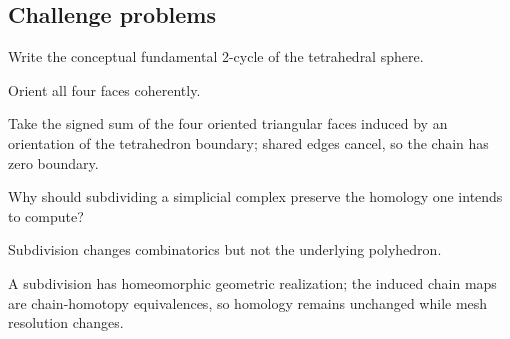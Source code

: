 \subsection*{Challenge problems}

\begin{exercise}\label{exr:viii15-ped-15}
Write the conceptual fundamental 2-cycle of the tetrahedral sphere.
\end{exercise}
\begin{hint}
Orient all four faces coherently.
\end{hint}
\begin{solution}
Take the signed sum of the four oriented triangular faces induced by an orientation of the tetrahedron boundary; shared edges cancel, so the chain has zero boundary.
\end{solution}

\begin{exercise}\label{exr:viii15-ped-16}
Why should subdividing a simplicial complex preserve the homology one intends to compute?
\end{exercise}
\begin{hint}
Subdivision changes combinatorics but not the underlying polyhedron.
\end{hint}
\begin{solution}
A subdivision has homeomorphic geometric realization; the induced chain maps are chain-homotopy equivalences, so homology remains unchanged while mesh resolution changes.
\end{solution}


